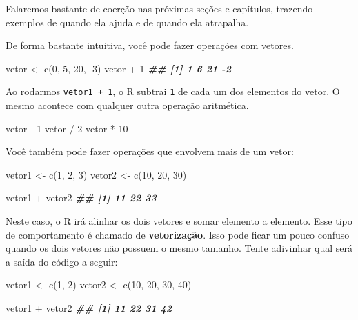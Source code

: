 \documentclass[
]{book}
\newenvironment{Shaded}{\begin{snugshade}}{\end{snugshade}}
\newcommand{\DecValTok}[1]{\textcolor[rgb]{0.00,0.00,0.81}{#1}}
\newcommand{\DocumentationTok}[1]{\textcolor[rgb]{0.56,0.35,0.01}{\textbf{\textit{#1}}}}
\newcommand{\FunctionTok}[1]{\textcolor[rgb]{0.00,0.00,0.00}{#1}}
\newcommand{\NormalTok}[1]{#1}
\newcommand{\OtherTok}[1]{\textcolor[rgb]{0.56,0.35,0.01}{#1}}
\newcommand{\SpecialCharTok}[1]{\textcolor[rgb]{0.00,0.00,0.00}{#1}}
\begin{document}
Falaremos bastante de coerção nas próximas seções e capítulos, trazendo exemplos de quando ela ajuda e de quando ela atrapalha.

De forma bastante intuitiva, você pode fazer operações com vetores.

\begin{Shaded}
\begin{Highlighting}[]
\NormalTok{vetor }\OtherTok{\textless{}{-}} \FunctionTok{c}\NormalTok{(}\DecValTok{0}\NormalTok{, }\DecValTok{5}\NormalTok{, }\DecValTok{20}\NormalTok{, }\SpecialCharTok{{-}}\DecValTok{3}\NormalTok{)}
\NormalTok{vetor }\SpecialCharTok{+} \DecValTok{1}
\DocumentationTok{\#\# [1]  1  6 21 {-}2}
\end{Highlighting}
\end{Shaded}

Ao rodarmos \texttt{vetor1\ +\ 1}, o R subtrai \texttt{1} de cada um dos elementos do vetor. O mesmo acontece com qualquer outra operação aritmética.

\begin{Shaded}
\begin{Highlighting}[]
\NormalTok{vetor }\SpecialCharTok{{-}} \DecValTok{1}
\NormalTok{vetor }\SpecialCharTok{/} \DecValTok{2}
\NormalTok{vetor }\SpecialCharTok{*} \DecValTok{10}
\end{Highlighting}
\end{Shaded}

Você também pode fazer operações que envolvem mais de um vetor:

\begin{Shaded}
\begin{Highlighting}[]
\NormalTok{vetor1 }\OtherTok{\textless{}{-}} \FunctionTok{c}\NormalTok{(}\DecValTok{1}\NormalTok{, }\DecValTok{2}\NormalTok{, }\DecValTok{3}\NormalTok{)}
\NormalTok{vetor2 }\OtherTok{\textless{}{-}} \FunctionTok{c}\NormalTok{(}\DecValTok{10}\NormalTok{, }\DecValTok{20}\NormalTok{, }\DecValTok{30}\NormalTok{)}

\NormalTok{vetor1  }\SpecialCharTok{+}\NormalTok{ vetor2}
\DocumentationTok{\#\# [1] 11 22 33}
\end{Highlighting}
\end{Shaded}

Neste caso, o R irá alinhar os dois vetores e somar elemento a elemento. Esse tipo de comportamento é chamado de \textbf{vetorização}. Isso pode ficar um pouco confuso quando os dois vetores não possuem o mesmo tamanho. Tente adivinhar qual será a saída do código a seguir:

\begin{Shaded}
\begin{Highlighting}[]
\NormalTok{vetor1 }\OtherTok{\textless{}{-}} \FunctionTok{c}\NormalTok{(}\DecValTok{1}\NormalTok{, }\DecValTok{2}\NormalTok{)}
\NormalTok{vetor2 }\OtherTok{\textless{}{-}} \FunctionTok{c}\NormalTok{(}\DecValTok{10}\NormalTok{, }\DecValTok{20}\NormalTok{, }\DecValTok{30}\NormalTok{, }\DecValTok{40}\NormalTok{)}

\NormalTok{vetor1 }\SpecialCharTok{+}\NormalTok{ vetor2}
\DocumentationTok{\#\# [1] 11 22 31 42}
\end{Highlighting}
\end{Shaded}
\end{document}
